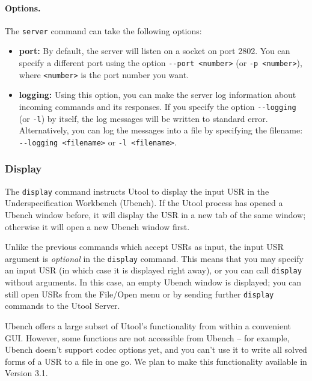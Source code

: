 \paragraph{Options.} The \verb?server? command can take the following
options:

\begin{itemize}
\item \textbf{port:} By default, the server will listen on a socket on port
2802. You can specify a different port using the option
\verb?--port <number>? (or \verb?-p <number>?), where \verb?<number>?
is the port number you want.

\item \textbf{logging:} Using this option, you can make the server log
information about incoming commands and its responses. If you specify
the option \verb?--logging? (or \verb?-l?) by itself, the log messages
will be written to standard error. Alternatively, you can log the
messages into a file by specifying the filename:
\verb?--logging <filename>? or \verb?-l <filename>?.
\end{itemize}




\subsubsection{Display}

The \verb?display? command instructs Utool to display the input USR in
the Underspecification Workbench (Ubench). If the Utool process has
opened a Ubench window before, it will display the USR in a new tab of
the same window; otherwise it will open a new Ubench window first.

Unlike the previous commands which accept USRs as input, the input USR
argument is \emph{optional} in the \verb?display? command. This means
that you may specify an input USR (in which case it is displayed right
away), or you can call \verb?display? without arguments. In this case,
an empty Ubench window is displayed; you can still open USRs from the
File/Open menu or by sending further \verb?display? commands to the
Utool Server.

Ubench offers a large subset of Utool's functionality from within a
convenient GUI. However, some functions are not accessible from Ubench
-- for example, Ubench doesn't support codec options yet, and you
can't use it to write all solved forms of a USR to a file in one
go. We plan to make this functionality available in Version 3.1.


